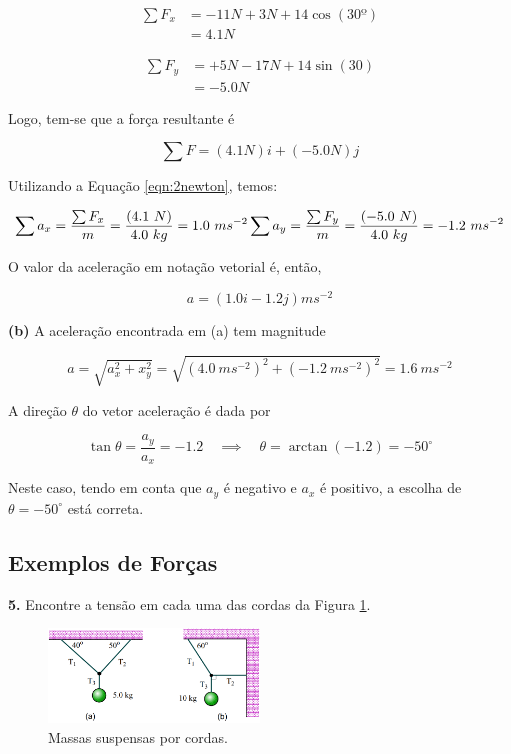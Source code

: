 $$
\begin{aligned}
    \sum F_x&=-11N+3N+14\cos(30º) \\
    &=4.1N
\end{aligned}
$$

$$
\begin{aligned}
    \sum F_y&=+5N-17N+14\sin(30) \\
    &=-5.0N
\end{aligned}
$$

Logo, tem-se que a força resultante é

$$
\sum F=(4.1N)i+(-5.0N)j
$$

Utilizando a Equação \ref{eqn:2newton}, temos:

$$
    \sum a_x=\frac{\sum F_x}{m}=\frac{(4.1\ N)}{4.0\ kg}=1.0\ ms^{-2} \\
    \sum a_y=\frac{\sum F_y}{m}=\frac{(-5.0\ N)}{4.0\ kg}=-1.2\ ms^{-2} \\
$$


O valor da aceleração em notação vetorial é, então,

$$
a=(1.0i-1.2j)ms^{-2}
$$

\textbf{(b)} A aceleração encontrada em (a) tem magnitude

$$
a=\sqrt{a_x^2+x_y^2}=\sqrt{(4.0\ ms^{-2})^2+(-1.2\ ms^{-2})^2}=1.6\ ms^{-2}
$$

A direção $\theta$ do vetor aceleração é dada por

$$
\tan \theta = \frac{a_y}{a_x} = -1.2 \quad \implies \quad \theta = \arctan(-1.2)=-50^{\circ}
$$

Neste caso, tendo em conta que $a_y$ é negativo e $a_x$ é positivo, a escolha de $\theta = -50^{\circ}$ está correta.

\subsection{Exemplos de Forças}
\textbf{5.} Encontre a tensão em cada uma das cordas da Figura \ref{fig:5caixa}.
\linebreak
\begin{figure}[h!]
    \centering
    \includegraphics[width=0.5\textwidth]{forças/fig/ex5.png}
    \caption{Massas suspensas por cordas.}
    \label{fig:5caixa}
\end{figure}

